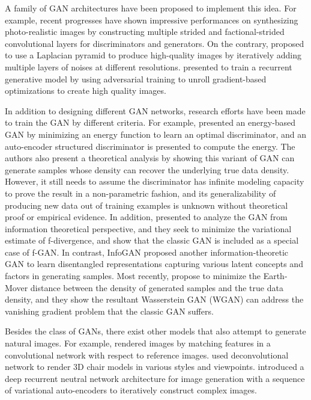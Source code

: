 \documentclass[11pt,fullpage, letterpaper,twoside]{article}
\newcommand{\1}[1]{\mathds{1}_{\left[#1\right]}}
\begin{document}
A family of GAN architectures have been proposed to implement this idea.  For example, recent progresses \cite{radford2015unsupervised,salimans2016improved} have shown impressive performances on synthesizing photo-realistic images by constructing multiple strided and factional-strided convolutional layers for discriminators and generators.  On the contrary, \cite{denton2015deep} proposed to use a Laplacian pyramid to produce high-quality images by iteratively adding multiple layers of noises at different resolutions. \cite{im2016generating} presented to train a recurrent generative model by using adversarial training to unroll gradient-based optimizations to create high quality images.

In addition to designing different GAN networks, research efforts have been made to train the GAN by different criteria. For example,
\cite{zhao2016energy} presented an energy-based GAN by minimizing an energy function to learn an optimal discriminator, and an auto-encoder structured discriminator is presented to compute the energy.  The authors also present a theoretical analysis by showing this variant of GAN can generate samples whose density can recover the underlying true data density.  However, it still needs to assume the discriminator has infinite modeling capacity to prove the result in a non-parametric fashion, and its generalizability of producing new data out of training examples is unknown without theoretical proof or empirical evidence.
In addition, \cite{nowozin2016f} presented to analyze the GAN from information theoretical perspective, and they seek to minimize the variational estimate of f-divergence, and show that the classic GAN is included as a special case of f-GAN. In contrast, InfoGAN \cite{chen2016infogan} proposed another information-theoretic GAN to learn disentangled representations capturing various latent concepts and factors in generating samples. Most recently, \cite{wgan17} propose to minimize the Earth-Mover distance between the density of generated samples and the true data density, and they show the resultant Wasserstein GAN (WGAN) can address the vanishing gradient problem that the classic GAN suffers.

Besides the class of GANs, there exist other models that also attempt to generate natural images. For example, \cite{gatys2015neural} rendered images by matching features in a convolutional network with respect to reference images.  \cite{dosovitskiy2015learning} used deconvolutional network to render 3D chair models in various styles and viewpoints.  \cite{gregor2015draw} introduced a deep recurrent neutral network architecture for image generation with a sequence of variational auto-encoders to iteratively construct complex images.
\end{document}
